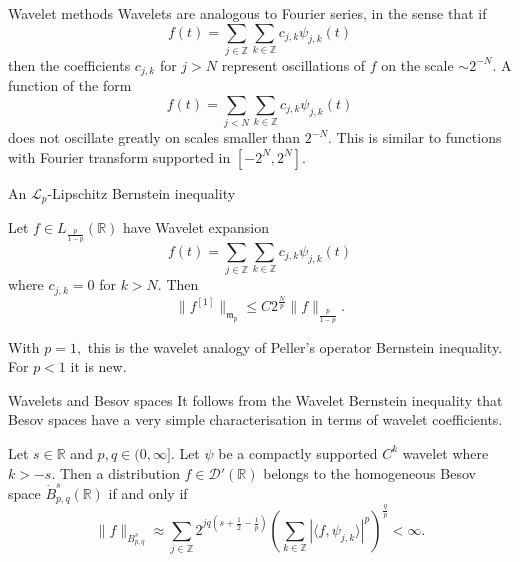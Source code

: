 \documentclass{beamer}
\numberwithin{equation}{section}
\theoremstyle{plain}
\theoremstyle{plain}
\theoremstyle{definition}
\theoremstyle{plain}
\theoremstyle{plain}
\theoremstyle{definition}
\newcommand{\Rl}{\mathbb{R}}
\newcommand{\Itgr}{\mathbb{Z}}
\newcommand{\Dc}{\mathcal{D}}
\newcommand{\Lc}{\mathcal{L}}
\newcommand{\mf}{\mathfrak{m}}
\begin{document}
\begin{frame}{Wavelet methods}
    Wavelets are analogous to Fourier series, in the sense that if
    \[
        f(t) = \sum_{j\in \Itgr} \sum_{k\in \Itgr} c_{j,k}\psi_{j,k}(t)
    \]
    then the coefficients $c_{j,k}$ for $j>N$ represent oscillations of $f$ on the scale $\sim 2^{-N}.$ A function of the form
    \[
        f(t) = \sum_{j<N} \sum_{k\in \Itgr}c_{j,k}\psi_{j,k}(t)
    \]
    does not oscillate greatly on scales smaller than $2^{-N}.$ This is similar to functions with Fourier transform supported in $[-2^N,2^N].$
\end{frame}

\begin{frame}{An $\Lc_p$-Lipschitz Bernstein inequality}
        \begin{theorem}[M.-Sukochev (2022)]
        Let $f\in L_{\frac{p}{1-p}}(\Rl)$ have Wavelet expansion
        \[
            f(t) = \sum_{j\in \Itgr} \sum_{k\in \Itgr} c_{j,k}\psi_{j,k}(t)
        \]
        where $c_{j,k}=0$ for $k>N.$ Then
        \[
            \|f^{[1]}\|_{\mf_p} \leq C2^{\frac{N}{p}} \|f\|_{\frac{p}{1-p}}.
        \]
    \end{theorem}
    With $p=1,$ this is the wavelet analogy of Peller's operator Bernstein inequality. For $p<1$ it is new.
\end{frame}


\begin{frame}{Wavelets and Besov spaces}
    It follows from the Wavelet Bernstein inequality that Besov spaces have a very simple characterisation in terms of wavelet coefficients.
    \begin{theorem}[Meyer (1986)]
        Let $s \in \Rl$ and $p,q\in (0,\infty].$ Let $\psi$ be a compactly supported $C^k$ wavelet where $k > -s.$ Then a distribution $f\in \Dc'(\Rl)$
        belongs to the homogeneous Besov space $\dot{B}^{s}_{p,q}(\Rl)$ if and only if
        \begin{equation*}
            \|f\|_{B^s_{p,q}}\approx \sum_{j\in \Itgr} 2^{jq(s+\frac{1}{2}-\frac{1}{p})}\left(\sum_{k\in \Itgr} |\langle f,\psi_{j,k}\rangle|^p\right)^{\frac{q}{p}} < \infty.
        \end{equation*}
    \end{theorem}
\end{frame}
\end{document}
